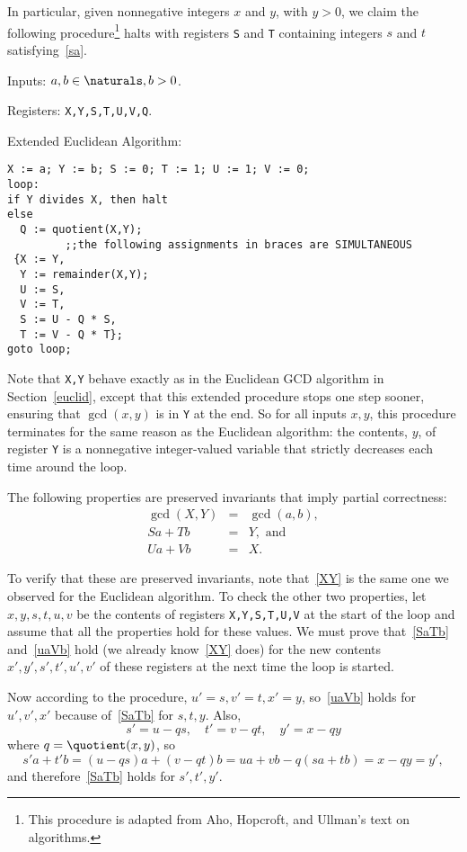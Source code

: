 In particular, given nonnegative integers $x$ and $y$, with $y>0$, we
claim the following procedure\footnote{This procedure is adapted from Aho,
  Hopcroft, and Ullman's text on algorithms.}  halts with registers
\texttt{S} and \texttt{T} containing integers $s$ and $t$
satisfying~\eqref{sa}.

Inputs: $a,b \in \naturals, b>0$.

Registers: \texttt{X,Y,S,T,U,V,Q}.

Extended Euclidean Algorithm:
\begin{center}
\begin{verbatim}
X := a; Y := b; S := 0; T := 1; U := 1; V := 0; 
loop:
if Y divides X, then halt
else
  Q := quotient(X,Y);
         ;;the following assignments in braces are SIMULTANEOUS
 {X := Y,
  Y := remainder(X,Y);
  U := S,
  V := T,
  S := U - Q * S,
  T := V - Q * T};
goto loop;
\end{verbatim}
\end{center}

Note that \texttt{X,Y} behave exactly as in the Euclidean GCD algorithm in
Section~\ref{euclid}, except that this extended procedure stops one step
sooner, ensuring that $\gcd(x,y)$ is in \texttt{Y} at the end.  So for all
inputs $x,y$, this procedure terminates for the same reason as the
Euclidean algorithm: the contents, $y$, of register \texttt{Y} is a
nonnegative integer-valued variable that strictly decreases each time
around the loop.

The following properties are preserved invariants that imply partial
correctness:
\begin{eqnarray}
\gcd(X,Y) &=& \gcd(a,b), \label{XY}\\
Sa+Tb &=& Y,\text{ and }\label{SaTb}\\
Ua+Vb &=& X. \label{uaVb}
\end{eqnarray}

To verify that these are preserved invariants, note that~\eqref{XY} is the
same one we observed for the Euclidean algorithm.  To check the other two
properties, let $x,y,s,t,u,v$ be the contents of registers
\texttt{X,Y,S,T,U,V} at the start of the loop and assume that all the
properties hold for these values.  We must prove that~\eqref{SaTb}
and~\eqref{uaVb} hold (we already know~\eqref{XY} does) for the new
contents $x',y',s',t',u',v'$ of these registers at the next time the loop
is started.

Now according to the procedure, $u'=s,v'=t,x'=y$, so~\eqref{uaVb} holds
for $u',v',x'$ because of~\eqref{SaTb} for $s,t,y$.  Also, 
\[
s'= u - qs,\quad t'= v - qt,\quad y' = x - qy
\]
where $q = \quotient(x,y)$,
so
\[
s'a+t'b = (u-qs)a + (v-qt)b =ua+vb - q(sa+tb) = x - qy = y',
\]
and therefore~\eqref{SaTb} holds for $s',t',y'$.

